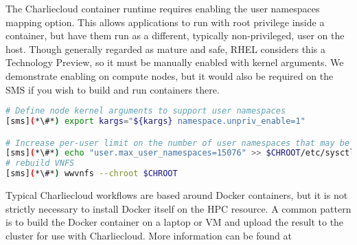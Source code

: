 The Charliecloud container runtime requires enabling the user namespaces mapping
option. This allows applications to run with root privilege inside a container, 
but have them run as a different, typically non-privileged, user on the host.
Though generally regarded as mature and safe, RHEL considers this a Technology
Preview, so it must be manually enabled with kernel arguments. We demonstrate
enabling on compute nodes, but it would also be required on the SMS if you wish
to build and run containers there.

\begin{lstlisting}[language=bash,keywords={},upquote=true]
# Define node kernel arguments to support user namespaces
[sms](*\#*) export kargs="${kargs} namespace.unpriv_enable=1"

# Increase per-user limit on the number of user namespaces that may be created
[sms](*\#*) echo "user.max_user_namespaces=15076" >> $CHROOT/etc/sysctl.conf
# rebuild VNFS
[sms](*\#*) wwvnfs --chroot $CHROOT
\end{lstlisting}

\begin{center}
\begin{tcolorbox}[]
\small
Typical Charliecloud workflows are based around Docker containers, but it is not
strictly necessary to install Docker itself on the HPC resource. A common
pattern is to build the Docker container on a laptop or VM and upload the result
to the cluster for use with Charliecloud. More information can be found at
\href{https://hpc.github.io/charliecloud/}
    {\color{blue}{https://hpc.github.io/charliecloud/}}
\end{tcolorbox}
\end{center}
